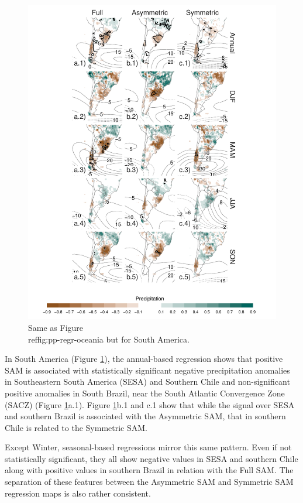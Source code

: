 \documentclass[smallextended]{svjour3}       %
\begin{document}
\begin{figure}
\includegraphics{pp-regr-america-1} \caption{Same as Figure \\ref{fig:pp-regr-oceania} but for South America.}\label{fig:pp-regr-america}
\end{figure}

In South America (Figure \ref{fig:pp-regr-america}), the annual-based regression shows that positive SAM is associated with statistically significant negative precipitation anomalies in Southeastern South America (SESA) and Southern Chile and non-significant positive anomalies in South Brazil, near the South Atlantic Convergence Zone (SACZ) (Figure \ref{fig:pp-regr-america}a.1). Figure \ref{fig:pp-regr-america}b.1 and c.1 show that while the signal over SESA and southern Brazil is associated with the Asymmetric SAM, that in southern Chile is related to the Symmetric SAM.

Except Winter, seasonal-based regressions mirror this same pattern. Even if not statistically significant, they all show negative values in SESA and southern Chile along with positive values in southern Brazil in relation with the Full SAM. The separation of these features between the Asymmetric SAM and Symmetric SAM regression maps is also rather consistent.
\end{document}
